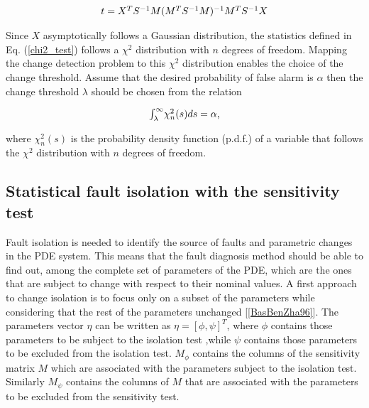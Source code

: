 \documentclass[journal]{IEEEtran}
\begin{document}
\begin{equation} \label{chi2_test}
\begin{tabular}{c}
$t={X^T}{S^{-1}}M({M^T}{S^{-1}}M)^{-1}{M^T}S^{-1}X$
\end{tabular}
\end{equation}

\noindent Since $X$ asymptotically follows a Gaussian distribution, the statistics defined in Eq. (\ref{chi2_test}) follows a $\chi^2$ distribution with $n$ degrees of freedom. Mapping the change detection problem to this $\chi^2$ distribution enables the choice of the change threshold. Assume that the desired probability of false alarm is $\alpha$ then the change threshold $\lambda$ should be chosen from the relation

\begin{equation} \label{alarm_threshold}
\begin{tabular}{c}
${\int_{\lambda}^{\infty}}{\chi_n^2}(s)ds=\alpha$,
\end{tabular}
\end{equation}

\noindent where ${\chi_n^2}(s)$ is the probability density function (p.d.f.) of a variable that follows the $\chi^2$ distribution with $n$ degrees of freedom.

\subsection{Statistical fault isolation with the sensitivity test}

\noindent Fault isolation is needed to identify the source of faults and parametric changes in the PDE system. This means that the fault diagnosis method should be able to find out, among the complete set of parameters of the PDE, which are the ones that are subject to change with respect to their nominal values. A first approach to change isolation is to focus only on a subset of the parameters while considering that the rest of the parameters unchanged [\ref{BasBenZha96}]. The parameters vector $\eta$ can be written as $\eta=[\phi,\psi]^T$, where $\phi$ contains those parameters to be subject to the isolation test ,while $\psi$ contains those parameters to be excluded from the isolation test. $M_{\phi}$ contains the columns of the sensitivity matrix $M$ which are associated with the parameters subject to the isolation test. Similarly $M_{\psi}$ contains the columns of $M$ that are associated with the parameters to be excluded from the sensitivity test.\\
\end{document}
